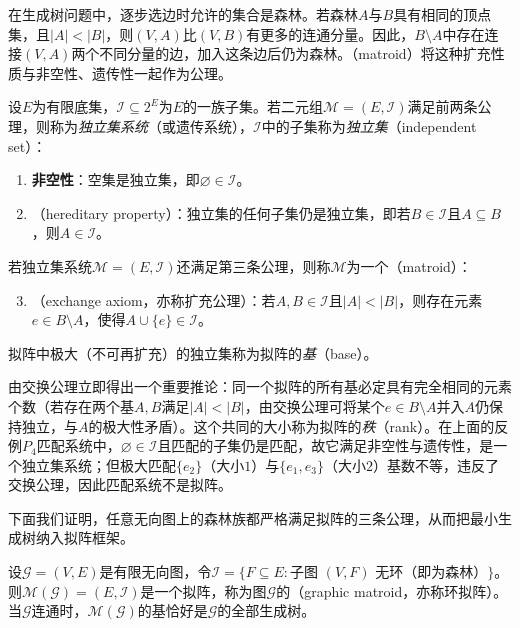 在生成树问题中，逐步选边时允许的集合是森林。若森林$A$与$B$具有相同的顶点集，且$|A|<|B|$，则$(V,A)$比$(V,B)$有更多的连通分量。因此，$B\setminus A$中存在连接$(V,A)$两个不同分量的边，加入这条边后仍为森林。（matroid）将这种扩充性质与非空性、遗传性一起作为公理。

\begin{definition}[独立集系统与拟阵]
\label{def:matroid}
设$E$为有限底集，$\mathcal I\subseteq 2^E$为$E$的一族子集。若二元组$\mathcal M=(E,\mathcal I)$满足前两条公理，则称为\emph{独立集系统}（或遗传系统），$\mathcal I$中的子集称为\emph{独立集}（independent set）：
\begin{enumerate}
  \item \textbf{非空性}：空集是独立集，即$\varnothing\in\mathcal I$。
  \item \textbf{}（hereditary property）：独立集的任何子集仍是独立集，即若$B\in\mathcal I$且$A\subseteq B$，则$A\in\mathcal I$。
\end{enumerate}
若独立集系统$\mathcal M=(E,\mathcal I)$还满足第三条公理，则称$\mathcal M$为一个（matroid）：
\begin{enumerate}
  \setcounter{enumi}{2}
  \item \textbf{}（exchange axiom，亦称扩充公理）：若$A,B\in\mathcal I$且$|A|<|B|$，则存在元素$e\in B\setminus A$，使得$A\cup\{e\}\in\mathcal I$。
\end{enumerate}
拟阵中极大（不可再扩充）的独立集称为拟阵的\emph{基}（base）。
\end{definition}

由交换公理立即得出一个重要推论：同一个拟阵的所有基必定具有完全相同的元素个数（若存在两个基$A,B$满足$|A|<|B|$，由交换公理可将某个$e\in B\setminus A$并入$A$仍保持独立，与$A$的极大性矛盾）。这个共同的大小称为拟阵的\emph{秩}（rank）。在上面的反例$P_4$匹配系统中，$\varnothing\in\mathcal I$且匹配的子集仍是匹配，故它满足非空性与遗传性，是一个独立集系统；但极大匹配$\{e_2\}$（大小$1$）与$\{e_1,e_3\}$（大小$2$）基数不等，违反了交换公理，因此匹配系统不是拟阵。

下面我们证明，任意无向图上的森林族都严格满足拟阵的三条公理，从而把最小生成树纳入拟阵框架。

\begin{theorem}[图拟阵]
\label{thm:graphic-matroid}
设$\mathcal G=(V,E)$是有限无向图，令$\mathcal I=\{F\subseteq E:\text{子图 }(V,F)\text{ 无环（即为森林）}\}$。则$\mathcal M(\mathcal G)=(E,\mathcal I)$是一个拟阵，称为图$\mathcal G$的（graphic matroid，亦称环拟阵）。当$\mathcal G$连通时，$\mathcal M(\mathcal G)$的基恰好是$\mathcal G$的全部生成树。
\end{theorem}

